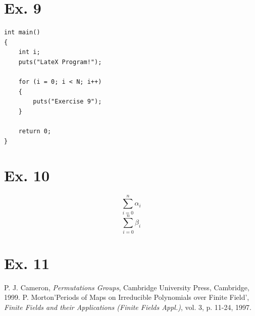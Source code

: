 \documentclass{article}
\begin{document}
\begin{center}
\section{Ex.  9}
\begin{lstlisting}
int main()
{
    int i;
    puts("LateX Program!");
    
    for (i = 0; i < N; i++)
    {
        puts("Exercise 9");
    }

    return 0;
}
\end{lstlisting}
\section{Ex.  10}
\newcommand{\summation}[1]{$$\sum\limits_{i=0}^n #1_i$$}
\summation{\alpha}
\summation{\beta}
\section{Ex.  11}
\begin{thebibliography}{9}
P. J. Cameron, \emph{Permutations Groups}, Cambridge University Press, Cambridge, 1999.
P. Morton'Periods of Maps on Irreducible Polynomials over Finite Field',
\emph{Finite Fields and their Applications (Finite Fields Appl.)}, vol. 3, p. 11-24, 1997. 
\end{thebibliography}
\end{center}
\end{document}

